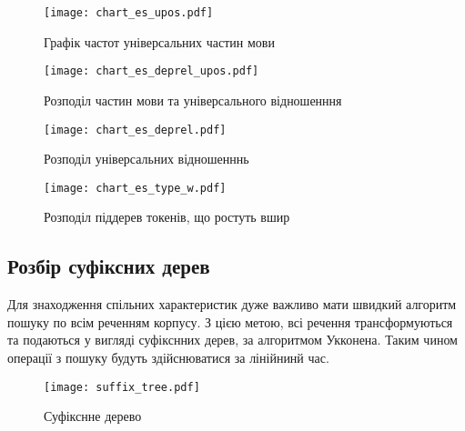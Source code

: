 \begin{multicols}{2}
\begin{figure}[H]
  \begin{center}
    \texttt{[image: chart\_es\_upos.pdf]}
  \end{center}
  \caption{Графік частот універсальних частин мови}
  \label{img:es_upos}
\end{figure}

\begin{figure}[H]
  \begin{center}
    \texttt{[image: chart\_es\_deprel\_upos.pdf]}
  \end{center}
  \caption{Розподіл частин мови та універсального відношенння}
  \label{img:es_deprel_upos}
\end{figure}

\begin{figure}[H]
  \begin{center}
    \texttt{[image: chart\_es\_deprel.pdf]}
  \end{center}
  \caption{Розподіл універсальних відношенннь}
  \label{img:es0}
\end{figure}

\begin{figure}[H]
  \begin{center}
    \texttt{[image: chart\_es\_type\_w.pdf]}
  \end{center}
  \caption{Розподіл піддерев токенів, що ростуть вшир}
  \label{img:es3}
\end{figure}

\end{multicols}

\newpage
\subsection{Розбір суфіксних дерев}
Для знаходження спільних характеристик дуже важливо мати
швидкий алгоритм пошуку по всім реченням корпусу. З цією метою,
всі речення трансформуються та подаються у вигляді суфікснних дерев, за 
алгоритмом Укконена. Таким чином операції з пошуку будуть здійснюватися за лінійнинй час.

\begin{figure}[ht]
  \begin{center}
    \texttt{[image: suffix\_tree.pdf]}
  \end{center}
  \caption{Суфікснне дерево}
  \label{img:suffix_tree}
\end{figure}

